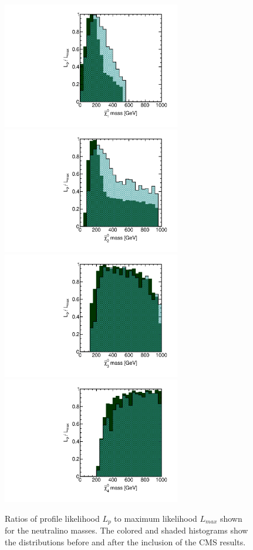 \begin{figure}[htbp]
\begin{center}
\includegraphics[height=5.5cm]{figs/fig_chi_1_0.pdf} 
\includegraphics[height=5.5cm]{figs/fig_chi_2_0.pdf} \\
\includegraphics[height=5.5cm]{figs/fig_chi_3_0.pdf} 
\includegraphics[height=5.5cm]{figs/fig_chi_4_0.pdf} 
\caption{Ratios of profile likelihood $L_p$ to maximum likelihood $L_{max}$ shown for the neutralino masses.  The colored and shaded histograms show the distributions before and after the inclusion of the CMS results.}
\label{fig:LRwcms_chi0}
\end{center}
\end{figure}

